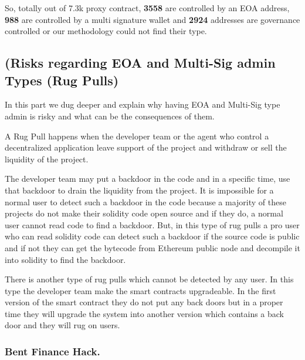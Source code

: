 So, totally out of 7.3k proxy contract, \textbf{3558} are controlled by an EOA address, \textbf{988} are controlled by a multi signature wallet and \textbf{2924} addresses are governance controlled or our methodology could not find their type.


\subsection{(Risks regarding EOA and Multi-Sig admin Types (Rug Pulls)}
In this part we dug deeper and explain why having EOA and Multi-Sig type admin is risky and what can be the consequences of them.

A Rug Pull happens when the developer team or the agent who control a decentralized application leave support of the project and withdraw or sell the liquidity of the project\cite{rugPool}.

The developer team may put a backdoor in the code and in a specific time, use that backdoor to drain the liquidity from the project. It is impossible for a normal user to detect such a backdoor in the code because a majority of these projects do not make their solidity code open source and if they do, a normal user cannot read code to find a backdoor. But, in this type of rug pulls a pro user who can read solidity code can detect such a backdoor if the source code is public and if not they can get the bytecode from Ethereum public node and decompile it into solidity to find the backdoor.

There is another type of rug pulls which cannot be detected by any user. In this type the developer team make the smart contracts upgradeable. In the first version of the smart contract they do not put any back doors but in a proper time they will upgrade the system into another version which contains a back door and they will rug on users. 

\subsubsection{Bent Finance Hack.}

